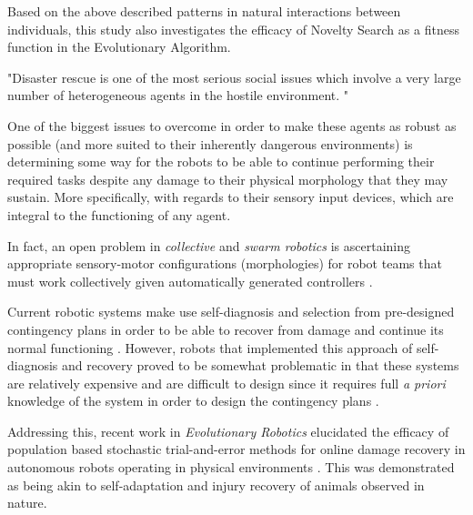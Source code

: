 
Based on the above described patterns in natural interactions between individuals, this study also investigates the efficacy of Novelty Search as a fitness function in the Evolutionary Algorithm.


"Disaster rescue is one of the most serious social issues which involve a very large number of heterogeneous agents in the hostile environment. "\cite{KitanoTadokoro1999}


One of the biggest issues to overcome in order to make these agents as robust as possible (and more suited to their inherently dangerous environments) is determining some way for the robots to be able to continue performing their required tasks despite any damage to their physical morphology that they may sustain. More specifically, with regards to their sensory input devices, which are integral to the functioning of any agent.

In fact, an open problem in \textit{collective} \cite{KubeZhang1994B} and \textit{swarm robotics} \cite{Beni2004}
is ascertaining appropriate sensory-motor configurations (morphologies) for robot teams that must work collectively given automatically generated controllers \cite{FloreanoDurrMattiussi2008}.

Current robotic systems make use self-diagnosis and selection from pre-designed contingency plans in order to be able to recover from damage and continue its normal functioning \cite{fenton2001fault, verma2004real, BongardZykovLipson2006}. However, robots that implemented this approach of self-diagnosis and recovery proved to be somewhat problematic in that these systems are relatively expensive and are difficult to design since it requires full \textit{a priori} knowledge of the system in order to design the contingency plans \cite{CullyCluneTaraporeMouret2015}.





Addressing this, recent work in \textit{Evolutionary Robotics} elucidated the efficacy of population based stochastic trial-and-error methods for online damage recovery in autonomous robots operating in physical environments \cite{CullyCluneTaraporeMouret2015}.
This was demonstrated as being akin to self-adaptation and injury recovery of animals observed in nature.

